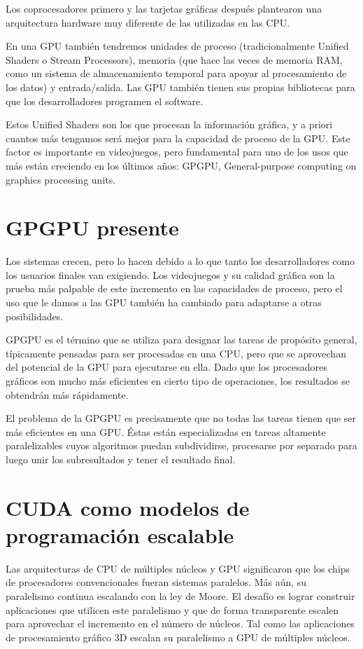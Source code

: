 \documentclass[a4paper,openright,12pt, oneside]{book}
\begin{document}
Los coprocesadores primero y las tarjetas gr\'aficas despu\'es plantearon una arquitectura hardware muy diferente de las utilizadas en las CPU.

En una GPU tambi\'en tendremos unidades de proceso (tradicionalmente Unified Shaders o Stream Processors), memoria (que hace las veces de memoria RAM, como un sistema de almacenamiento temporal para apoyar al procesamiento de los datos) y entrada/salida. Las GPU tambi\'en tienen sus propias bibliotecas para que los desarrolladores programen el software.

Estos Unified Shaders son los que procesan la informaci\'on gr\'afica, y a priori cuantos m\'as tengamos ser\'a mejor para la capacidad de proceso de la GPU. Este factor es importante en videojuegos, pero fundamental para uno de los usos que m\'as est\'an creciendo en los \'ultimos a\~nos: GPGPU, General-purpose computing on graphics processing units.

\section{GPGPU presente}

Los sistemas crecen, pero lo hacen debido a lo que tanto los desarrolladores como los usuarios finales van exigiendo. Los videojuegos y su calidad gr\'afica son la prueba m\'as palpable de este incremento en las capacidades de proceso, pero el uso que le damos a las GPU tambi\'en ha cambiado para adaptarse a otras posibilidades.

GPGPU es el t\'ermino que se utiliza para designar las tareas de prop\'osito general, t\'ipicamente pensadas para ser procesadas en una CPU, pero que se aprovechan del potencial de la GPU para ejecutarse en ella. Dado que los procesadores gr\'aficos son mucho m\'as eficientes en cierto tipo de operaciones, los resultados se obtendr\'an m\'as r\'apidamente.

El problema de la GPGPU es precisamente que no todas las tareas tienen que ser m\'as eficientes en una GPU. \'Estas est\'an especializadas en tareas altamente paralelizables cuyos algoritmos puedan subdividirse, procesarse por separado para luego unir los subresultados y tener el resultado final.


\section{CUDA como modelos de programaci\'on escalable}

Las arquitecturas de CPU de m\'ultiples n\'ucleos y GPU significaron que los chips 
de procesadores convencionales fueran sistemas paralelos. M\'as a\'un, su paralelismo
continua escalando con la ley de Moore. El desaf\'io es lograr construir aplicaciones
que utilicen este paralelismo y que de forma transparente escalen para aprovechar
el incremento en el n\'umero de n\'ucleos. Tal como las aplicaciones de procesamiento
gr\'afico 3D escalan su paralelismo a GPU de m\'ultiples n\'ucleos.
\end{document}
